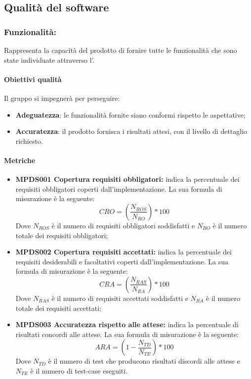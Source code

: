 \documentclass[NormeDiProgetto.tex]{subfiles}
\begin{document}
	\subsection{Qualità del software}
	\subsubsection{Funzionalità:} Rappresenta la capacità del prodotto di fornire tutte le funzionalità che sono state individuate attraverso l'\adr.	
	\paragraph{Obiettivi qualità}
	Il gruppo \gruppo si impegnerà per perseguire:
	\begin{itemize}
		\item \textbf{Adeguatezza}: le funzionalità fornite siano conformi rispetto le aspettative;
		\item \textbf{Accuratezza}: il prodotto fornisca i risultati attesi, con il livello di dettaglio richiesto. 
	\end{itemize}	
	\paragraph{Metriche}
	\begin{itemize}
		\item \textbf{MPDS001 Copertura requisiti obbligatori:} indica la percentuale dei requisiti obbligatori coperti dall'implementazione. La sua formula di misurazione è la seguente: \[CRO=(\frac{N_{ROS}}{N_{RO}})*100\] Dove $ N_{ROS} $ è il numero di requisiti obbligatori soddisfatti e $ N_{RO} $ è il numero totale dei requisiti obbligatori;
		\item \textbf{MPDS002 Copertura requisiti accettati:} indica la percentuale dei requisiti desiderabili e facoltativi coperti dall'implementazione. La sua formula di misurazione è la seguente: \[CRA=(\frac{N_{RAS}}{N_{RA}})*100\] Dove $ N_{RAS} $ è il numero di requisiti accettati soddisfatti e $ N_{RA } $ è il numero totale dei requisiti accettati;
		\item \textbf{MPDS003 Accuratezza rispetto alle attese:} indica la percentuale di risultati concordi alle attese. La sua formula di misurazione è la seguente: \[ARA=(1-\frac{N_{TD}}{N_{TE}})*100\] Dove $ N_{TD} $ è il numero di test che producono risultati discordi alle attese e $ N_{TE} $ è il numero di test-case eseguiti.
	\end{itemize}
	
\end{document}
